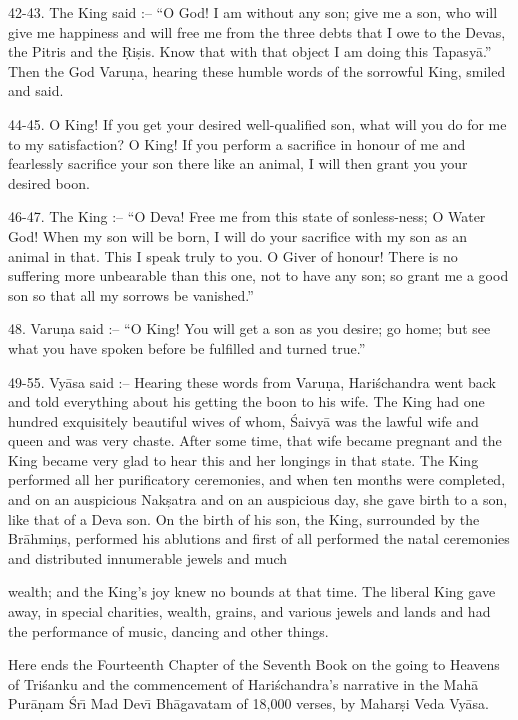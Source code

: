 42-43. The King said :-- ``O God! I am without any son; give me a son, who will give me happiness and will free me from the three debts that I owe to the Devas, the Pitris and the \d{R}i\d{s}is. Know that with that object I am doing this Tapasy\=a.'' Then the God Varu\d{n}a, hearing these humble words of the sorrowful King, smiled and said.

44-45. O King! If you get your desired well-qualified son, what will you do for me to my satisfaction? O King! If you perform a sacrifice in honour of me and fearlessly sacrifice your son there like an animal, I will then grant you your desired boon.

46-47. The King :-- ``O Deva! Free me from this state of sonless-ness; O Water God! When my son will be born, I will do your sacrifice with my son as an animal in that. This I speak truly to you. O Giver of honour! There is no suffering more unbearable than this one, not to have any son; so grant me a good son so that all my sorrows be vanished.''

48. Varu\d{n}a said :-- ``O King! You will get a son as you desire; go home; but see what you have spoken before be fulfilled and turned true.''

49-55. Vy\=asa said :-- Hearing these words from Varu\d{n}a, Hari\'schandra went back and told everything about his getting the boon to his wife. The King had one hundred exquisitely beautiful wives of whom, \'Saivy\=a was the lawful wife and queen and was very chaste. After some time, that wife became pregnant and the King became very glad to hear this and her longings in that state. The King performed all her purificatory ceremonies, and when ten months were completed, and on an auspicious Nak\d{s}atra and on an auspicious day, she gave birth to a son, like that of a Deva son. On the birth of his son, the King, surrounded by the Br\=ahmi\d{n}s, performed his ablutions and first of all performed the natal ceremonies and distributed innumerable jewels and much

wealth; and the King's joy knew no bounds at that time. The liberal King gave away, in special charities, wealth, grains, and various jewels and lands and had the performance of music, dancing and other things.

Here ends the Fourteenth Chapter of the Seventh Book on the going to Heavens of Tri\'sanku and the commencement of Hari\'schandra's narrative in the Mah\=a Pur\=a\d{n}am \'Sr\={\i} Mad Dev\={\i} Bh\=agavatam of 18,000 verses, by Mahar\d{s}i Veda Vy\=asa.



